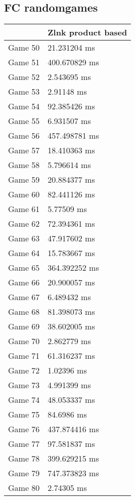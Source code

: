 \subsection{FC randomgames}
\begin{tabular}{|l|l|}
	\hline
	& Zlnk product based \\ \hline
	Game 50 & 21.231204 ms \\ \hline
	Game 51 & 400.670829 ms \\ \hline
	Game 52 & 2.543695 ms \\ \hline
	Game 53 & 2.91148 ms \\ \hline
	Game 54 & 92.385426 ms \\ \hline
	Game 55 & 6.931507 ms \\ \hline
	Game 56 & 457.498781 ms \\ \hline
	Game 57 & 18.410363 ms \\ \hline
	Game 58 & 5.796614 ms \\ \hline
	Game 59 & 20.884377 ms \\ \hline
	Game 60 & 82.441126 ms \\ \hline
	Game 61 & 5.77509 ms \\ \hline
	Game 62 & 72.394361 ms \\ \hline
	Game 63 & 47.917602 ms \\ \hline
	Game 64 & 15.783667 ms \\ \hline
	Game 65 & 364.392252 ms \\ \hline
	Game 66 & 20.900057 ms \\ \hline
	Game 67 & 6.489432 ms \\ \hline
	Game 68 & 81.398073 ms \\ \hline
	Game 69 & 38.602005 ms \\ \hline
	Game 70 & 2.862779 ms \\ \hline
	Game 71 & 61.316237 ms \\ \hline
	Game 72 & 1.02396 ms \\ \hline
	Game 73 & 4.991399 ms \\ \hline
	Game 74 & 48.053337 ms \\ \hline
	Game 75 & 84.6986 ms \\ \hline
	Game 76 & 437.874416 ms \\ \hline
	Game 77 & 97.581837 ms \\ \hline
	Game 78 & 399.629215 ms \\ \hline
	Game 79 & 747.373823 ms \\ \hline
	Game 80 & 2.74305 ms \\ \hline

\end{tabular}
